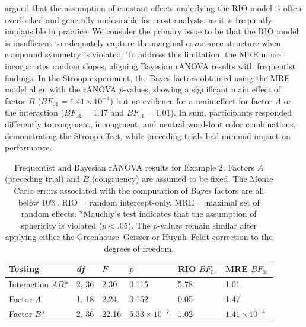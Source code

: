 \documentclass[preprint,12pt,authoryear]{elsarticle}
\begin{document}
\citet{van_den_bergh_bayesian_2023} argued that the assumption of constant effects underlying the RIO model is often overlooked and generally undesirable for most analysts, as it is frequently implausible in practice. We consider the primary issue to be that the RIO model is insufficient to adequately capture the marginal covariance structure when compound symmetry is violated. To address this limitation, the MRE model incorporates random slopes, aligning Bayesian rANOVA results with frequentist findings. In the Stroop experiment, the Bayes factors obtained using the MRE model align with the rANOVA $p$-values, showing a significant main effect of factor $B$ ($\mathit{BF}_{01}=1.41\times10^{-4}$) but no evidence for a main effect for factor $A$ or the interaction ($\mathit{BF}_{01}=1.47$ and $\mathit{BF}_{01}=1.01$). In sum, participants responded differently to congruent, incongruent, and neutral word-font color combinations, demonstrating the Stroop effect, while preceding trials had minimal impact on performance.

\begin{table}[t]
	\centering
	\begin{tabular}{@{}llllll@{}}
		\toprule
		Testing           & \textit{df} & $F$   & $p$                 & RIO $\mathit{BF}_{01}$ & MRE $\mathit{BF}_{01}$ \\ \midrule
		Interaction $AB$* & 2, 36       & 2.30  & 0.115               & 5.78                   & 1.01                   \\
		Factor $A$        & 1, 18       & 2.24  & 0.152               & 0.05                   & 1.47                   \\
		Factor $B$*       & 2, 36       & 22.16 & $5.33\times10^{-7}$ & 1.02                   & $1.41\times10^{-4}$    \\ \bottomrule
	\end{tabular}
\caption{Frequentist and Bayesian rANOVA results for Example 2. Factors $A$ (preceding trial) and $B$ (congruency) are assumed to be fixed. The Monte Carlo errors associated with the computation of Bayes factors are all below 10\%. RIO = random intercept-only. MRE = maximal set of random effects. *Mauchly's test indicates that the assumption of sphericity is violated ($p<.05$). The $p$-values remain similar after applying either the Greenhouse–Geisser or Huynh–Feldt correction to the degrees of freedom.}\label{tbl4}
\end{table}

\end{document}
